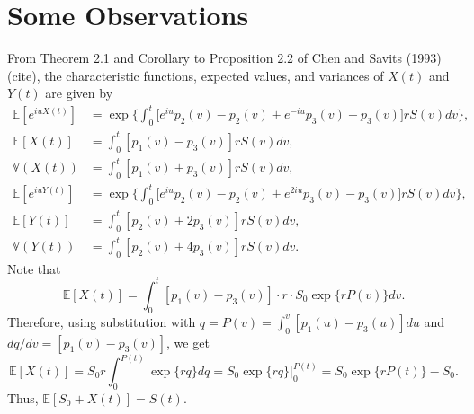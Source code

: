 \documentclass[10pt]{article}
\newcommand{\Var}{\mathbb{V}}
\newcommand{\EE}{\mathbb{E}}
\begin{document}
\section{Some Observations}

From Theorem 2.1 and Corollary to Proposition 2.2 of Chen and Savits (1993) (cite), the characteristic functions, expected values, and variances of $X(t)$ and $Y(t)$ are
given by
\begin{equation*}
\begin{split}
\EE[e^{iuX(t)}] &= \exp \Big\{ \int_0^t \Big[ e^{iu}p_2(v)-p_2(v) + e^{-iu}p_3(v) - p_3(v) \Big] r S(v) dv\Big\},\\
\EE[X(t)] &= \int_0^t [p_1(v) - p_3(v)] r S(v) dv,\\
\Var(X(t)) &= \int_0^t [p_1(v) + p_3(v)] r S(v) dv, \\
\EE[e^{iuY(t)}] &= \exp \Big\{ \int_0^t \Big[ e^{iu}p_2(v)-p_2(v) + e^{2iu}p_3(v) - p_3(v) \Big] r S(v) dv\Big\},\\
\EE[Y(t)] &= \int_0^t [p_2(v) + 2p_3(v)] r S(v) dv,\\
\Var(Y(t)) &= \int_0^t [p_2(v) + 4p_3(v)] r S(v) dv.
\end{split}
\end{equation*}
Note that
\begin{equation*}
\EE[X(t)] = \int_0^t [p_1(v) - p_3(v)] \cdot r \cdot S_0 \exp \Big\{ r P(v) \Big\} dv.
\end{equation*}
Therefore, using substitution with $q = P(v) = \int_0^v [p_1(u) - p_3(u)] du$ and $dq/dv = [p_1(v) - p_3(v)]$, we get
\begin{equation*}
\EE[X(t)] = S_0 r \int_0^{P(t)} \exp\{rq\}dq = S_0 \exp \{rq\} \Big \vert_0^{P(t)} = S_0 \exp\{r P(t)\} - S_0.
\end{equation*}
Thus, $\EE[S_0+X(t)] = S(t)$.
\end{document}

